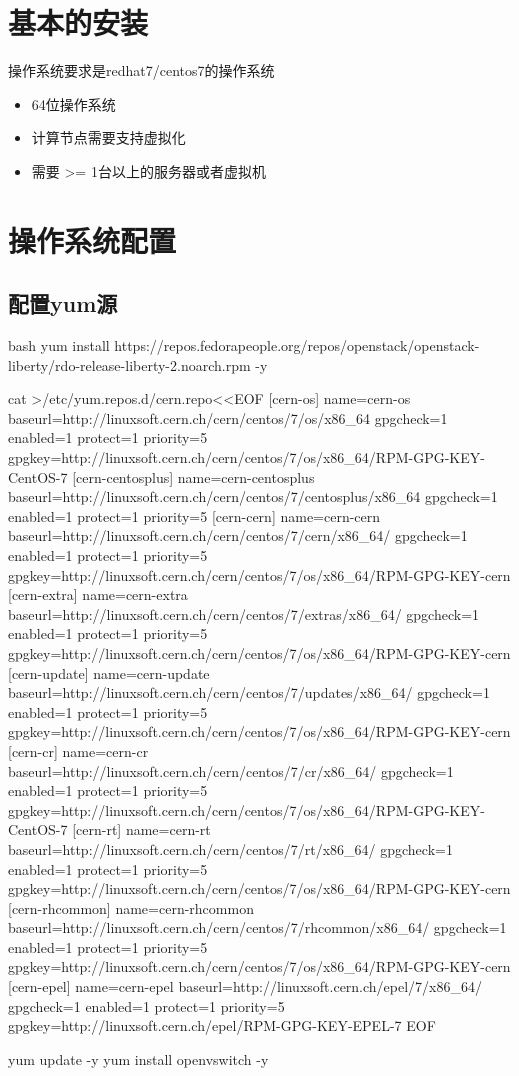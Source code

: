 \section{基本的安装}

操作系统要求是redhat7/centos7的操作系统
\begin{itemize}
  \item 64位操作系统
  \item 计算节点需要支持虚拟化
  \item 需要 >= 1台以上的服务器或者虚拟机
\end{itemize}

\section{操作系统配置}
\subsection{配置yum源}

\begin{long-block}{bash}
yum install https://repos.fedorapeople.org/repos/openstack/openstack-liberty/rdo-release-liberty-2.noarch.rpm -y

cat >/etc/yum.repos.d/cern.repo<<EOF
[cern-os]
name=cern-os
baseurl=http://linuxsoft.cern.ch/cern/centos/7/os/x86_64
gpgcheck=1
enabled=1
protect=1
priority=5
gpgkey=http://linuxsoft.cern.ch/cern/centos/7/os/x86_64/RPM-GPG-KEY-CentOS-7
[cern-centosplus]
name=cern-centosplus
baseurl=http://linuxsoft.cern.ch/cern/centos/7/centosplus/x86_64
gpgcheck=1
enabled=1
protect=1
priority=5
[cern-cern]
name=cern-cern
baseurl=http://linuxsoft.cern.ch/cern/centos/7/cern/x86_64/
gpgcheck=1
enabled=1
protect=1
priority=5
gpgkey=http://linuxsoft.cern.ch/cern/centos/7/os/x86_64/RPM-GPG-KEY-cern
[cern-extra]
name=cern-extra
baseurl=http://linuxsoft.cern.ch/cern/centos/7/extras/x86_64/
gpgcheck=1
enabled=1
protect=1
priority=5
gpgkey=http://linuxsoft.cern.ch/cern/centos/7/os/x86_64/RPM-GPG-KEY-cern
[cern-update]
name=cern-update
baseurl=http://linuxsoft.cern.ch/cern/centos/7/updates/x86_64/
gpgcheck=1
enabled=1
protect=1
priority=5
gpgkey=http://linuxsoft.cern.ch/cern/centos/7/os/x86_64/RPM-GPG-KEY-cern
[cern-cr]
name=cern-cr
baseurl=http://linuxsoft.cern.ch/cern/centos/7/cr/x86_64/
gpgcheck=1
enabled=1
protect=1
priority=5
gpgkey=http://linuxsoft.cern.ch/cern/centos/7/os/x86_64/RPM-GPG-KEY-CentOS-7
[cern-rt]
name=cern-rt
baseurl=http://linuxsoft.cern.ch/cern/centos/7/rt/x86_64/
gpgcheck=1
enabled=1
protect=1
priority=5
gpgkey=http://linuxsoft.cern.ch/cern/centos/7/os/x86_64/RPM-GPG-KEY-cern
[cern-rhcommon]
name=cern-rhcommon
baseurl=http://linuxsoft.cern.ch/cern/centos/7/rhcommon/x86_64/
gpgcheck=1
enabled=1
protect=1
priority=5
gpgkey=http://linuxsoft.cern.ch/cern/centos/7/os/x86_64/RPM-GPG-KEY-cern
[cern-epel]
name=cern-epel
baseurl=http://linuxsoft.cern.ch/epel/7/x86_64/
gpgcheck=1
enabled=1
protect=1
priority=5
gpgkey=http://linuxsoft.cern.ch/epel/RPM-GPG-KEY-EPEL-7
EOF

yum update -y
yum install openvswitch -y
\end{long-block}

